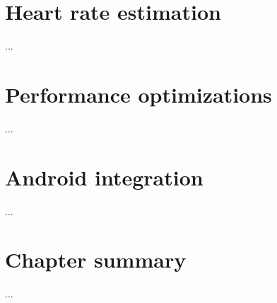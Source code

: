 \section{Heart rate estimation} \label{sec:impl:estimation}

...

\section{Performance optimizations} \label{sec:impl:performance}

...

\section{Android integration} \label{sec:impl:android}


...

\section{Chapter summary}

...
